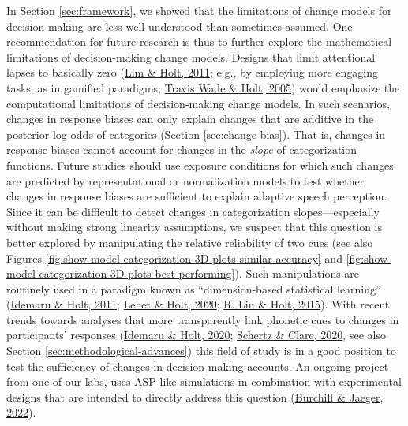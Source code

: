 \documentclass[
  11pt,
  english,
  man,floatsintext]{apa6}
\begin{document}
In Section \ref{sec:framework}, we showed that the limitations of change models for decision-making are less well understood than sometimes assumed. One recommendation for future research is thus to further explore the mathematical limitations of decision-making change models. Designs that limit attentional lapses to basically zero (\protect\hyperlink{ref-lim-holt2011}{Lim \& Holt, 2011}; e.g., by employing more engaging tasks, as in gamified paradigms, \protect\hyperlink{ref-wade-holt2005}{Travis Wade \& Holt, 2005}) would emphasize the computational limitations of decision-making change models. In such scenarios, changes in response biases can only explain changes that are additive in the posterior log-odds of categories (Section \ref{sec:change-bias}). That is, changes in response biases cannot account for changes in the \emph{slope} of categorization functions. Future studies should use exposure conditions for which such changes are predicted by representational or normalization models to test whether changes in response biases are sufficient to explain adaptive speech perception. Since it can be difficult to detect changes in categorization slopes---especially without making strong linearity assumptions, we suspect that this question is better explored by manipulating the relative reliability of two cues (see also Figures \ref{fig:show-model-categorization-3D-plots-similar-accuracy} and \ref{fig:show-model-categorization-3D-plots-best-performing}). Such manipulations are routinely used in a paradigm known as ``dimension-based statistical learning'' (\protect\hyperlink{ref-idemaru-holt2011}{Idemaru \& Holt, 2011}; \protect\hyperlink{ref-lehet-holt2020}{Lehet \& Holt, 2020}; \protect\hyperlink{ref-liu-holt2015}{R. Liu \& Holt, 2015}). With recent trends towards analyses that more transparently link phonetic cues to changes in participants' responses (\protect\hyperlink{ref-idemaru-holt2020}{Idemaru \& Holt, 2020}; \protect\hyperlink{ref-schertz-clare2020}{Schertz \& Clare, 2020}, see also Section \ref{sec:methodological-advances}) this field of study is in a good position to test the sufficiency of changes in decision-making accounts. An ongoing project from one of our labs, uses ASP-like simulations in combination with experimental designs that are intended to directly address this question (\protect\hyperlink{ref-burchill-jaeger2022}{Burchill \& Jaeger, 2022}).
\end{document}
